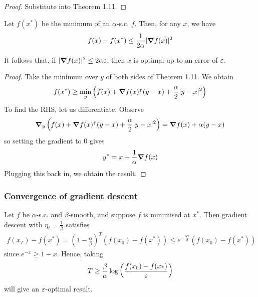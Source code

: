 \documentclass{../template/note}
\begin{document}
    \begin{proof}
        Substitute into Theorem 1.11.
    \end{proof}
    
    \begin{corollary}
        \label{alpha-sc-bound}
        Let $f(x^*)$ be the minimum of an $\alpha$-s.c. $f$. Then, for any $x$, we have
        \begin{align*}
            f(x) - f(x^*) \leq \frac 1 {2\alpha} |\grad f(x)|^2
        \end{align*}        
    \end{corollary}
    
    \begin{remark*}
        It follows that, if $|\grad f(x)|^2 \leq 2\alpha\eps$, then $x$ is optimal up to an error of $\varepsilon$.
    \end{remark*}
    
    \begin{proof}
        Take the minimum over $y$ of both sides of Theorem 1.11. We obtain
        \begin{align*}
            f(x^*) \geq \min_y \left(f(x) + \grad f(x)^\intercal (y-x) + \frac \alpha 2 |y-x|^2 \right)
        \end{align*}
        To find the RHS, let us differentiate. Observe
        \begin{align*}
            \grad_y \left(f(x) + \grad f(x)^\intercal (y-x) + \frac \alpha 2 |y-x|^2\right) = \grad f(x) + \alpha(y-x)
        \end{align*}
        so setting the gradient to 0 gives
        \begin{align*}
            y^* = x - \frac 1 \alpha \grad f(x)
        \end{align*}
        Plugging this back in, we obtain the result.       
    \end{proof}
    
    \subsubsection{Convergence of gradient descent}

    \begin{theorem}
        Let $f$ be $\alpha$-s.c. and $\beta$-smooth, and suppose $f$ is minimised at $x^*$. Then gradient descent with $\eta_t = \frac 1 \beta$ satisfies
        \begin{align*}
            f(x_T) - f(x^*) = \left(1-\frac \alpha \beta\right)^T \left(f(x_0)-f(x^*)\right) \leq e^{-\frac{\alpha T}\beta} \left(f(x_0)-f(x^*)\right)
        \end{align*}
        since $e^{-x} \geq 1-x$. Hence, taking
        \begin{align*}
            T \geq \frac \beta \alpha \log\left(\frac{f(x_0)-f(x*)}{\varepsilon}\right)
        \end{align*}
        will give an $\varepsilon$-optimal result.       
    \end{theorem}
    
\end{document}
